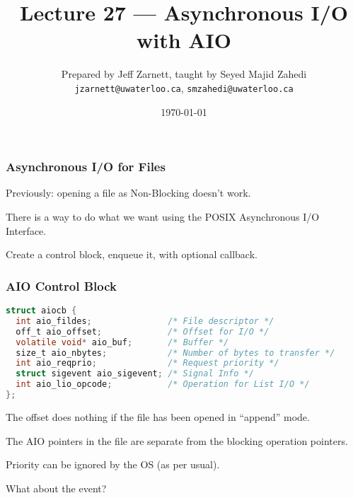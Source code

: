 

\title{Lecture 27 --- Asynchronous I/O with AIO }

\author{Prepared by Jeff Zarnett, taught by Seyed Majid Zahedi \\ \small \texttt{jzarnett@uwaterloo.ca}, \texttt{smzahedi@uwaterloo.ca}}

\date{\today}




\begin{frame}
	\titlepage

\end{frame}



\begin{frame}
	\frametitle{Asynchronous I/O for Files}

	Previously: opening a file as Non-Blocking doesn't work.

	There is a way to do what we want using the POSIX Asynchronous I/O Interface.

	Create a control block, enqueue it, with optional callback.

\end{frame}


\begin{frame}[fragile]
	\frametitle{AIO Control Block}

	\begin{lstlisting}[language=C]
struct aiocb {
  int aio_fildes;               /* File descriptor */
  off_t aio_offset;             /* Offset for I/O */
  volatile void* aio_buf;       /* Buffer */
  size_t aio_nbytes;            /* Number of bytes to transfer */
  int aio_reqprio;              /* Request priority */
  struct sigevent aio_sigevent; /* Signal Info */
  int aio_lio_opcode;           /* Operation for List I/O */
};
\end{lstlisting}

	The offset does nothing if the file has been opened in ``append'' mode.

	The AIO pointers in the file are separate from the blocking operation pointers.

	Priority can be ignored by the OS (as per usual).

	What about the event?

\end{frame}


